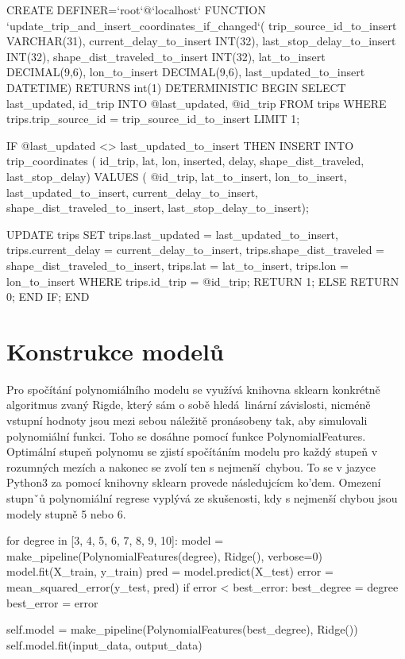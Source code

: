 \begin{code}[frame=none]
CREATE DEFINER=`root`@`localhost` FUNCTION
  `update_trip_and_insert_coordinates_if_changed`(
  trip_source_id_to_insert VARCHAR(31),
  current_delay_to_insert INT(32),
    last_stop_delay_to_insert INT(32),
  shape_dist_traveled_to_insert INT(32),
  lat_to_insert DECIMAL(9,6),
  lon_to_insert DECIMAL(9,6),
  last_updated_to_insert DATETIME) RETURNS int(1)
    DETERMINISTIC
BEGIN
  SELECT last_updated, id_trip
  INTO @last_updated, @id_trip
  FROM trips
  WHERE trips.trip_source_id = trip_source_id_to_insert
  LIMIT 1;

  IF @last_updated <> last_updated_to_insert THEN
    INSERT INTO trip_coordinates (
      id_trip,
      lat,
      lon,
      inserted,
      delay,
      shape_dist_traveled,
      last_stop_delay)
    VALUES (
      @id_trip,
      lat_to_insert,
      lon_to_insert,
      last_updated_to_insert,
      current_delay_to_insert,
      shape_dist_traveled_to_insert,
      last_stop_delay_to_insert);

    UPDATE trips
    SET trips.last_updated = last_updated_to_insert,
      trips.current_delay = current_delay_to_insert,
      trips.shape_dist_traveled = shape_dist_traveled_to_insert,
      trips.lat = lat_to_insert,
      trips.lon = lon_to_insert
    WHERE trips.id_trip = @id_trip;
        RETURN 1;
  ELSE
    RETURN 0;
  END IF;
END
\end{code}


\section{Konstrukce modelů}


Pro spočítání polynomiálního modelu se využívá knihovna sklearn konkrétně algoritmus zvaný Rigde, který sám o sobě hledá linární závislosti, nicméně vstupní hodnoty jsou mezi sebou náležitě pronásobeny tak, aby simulovali polynomiální funkci. Toho se dosáhne pomocí funkce PolynomialFeatures. Optimální stupeň polynomu se zjistí spočítáním modelu pro každý stupeň v rozumných mezích a nakonec se zvolí ten s nejmenší chybou. To se v jazyce Python3 za pomocí knihovny sklearn provede následujcícm ko'dem. Omezení stupnˇů polynomiální regrese vyplývá ze skušenosti, kdy s nejmenší chybou jsou modely stupně 5 nebo 6.

\begin{code}[frame=none]
for degree in [3, 4, 5, 6, 7, 8, 9, 10]:
  model = make_pipeline(PolynomialFeatures(degree), Ridge(), verbose=0)
  model.fit(X_train, y_train)
  pred = model.predict(X_test)
  error = mean_squared_error(y_test, pred)
  if error < best_error:
    best_degree = degree
    best_error = error

self.model = make_pipeline(PolynomialFeatures(best_degree), Ridge())
self.model.fit(input_data, output_data)
\end{code}

